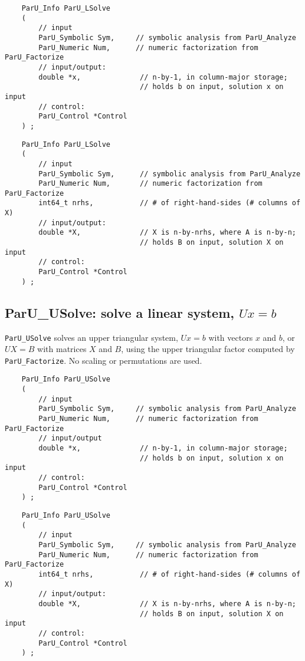 \documentclass[12pt]{article}
\begin{document}
    {\footnotesize
    \begin{verbatim}
    ParU_Info ParU_LSolve
    (
        // input
        ParU_Symbolic Sym,     // symbolic analysis from ParU_Analyze
        ParU_Numeric Num,      // numeric factorization from ParU_Factorize
        // input/output:
        double *x,              // n-by-1, in column-major storage;
                                // holds b on input, solution x on input
        // control:
        ParU_Control *Control
    ) ; \end{verbatim} }

    {\footnotesize
    \begin{verbatim}
    ParU_Info ParU_LSolve
    (
        // input
        ParU_Symbolic Sym,      // symbolic analysis from ParU_Analyze
        ParU_Numeric Num,       // numeric factorization from ParU_Factorize
        int64_t nrhs,           // # of right-hand-sides (# columns of X)
        // input/output:
        double *X,              // X is n-by-nrhs, where A is n-by-n;
                                // holds B on input, solution X on input
        // control:
        ParU_Control *Control
    ) ; \end{verbatim} }

\subsection{{\sf ParU\_USolve}: solve a linear system, $Ux=b$}

    \verb'ParU_USolve' solves an upper triangular system, $Ux=b$ with vectors
    $x$ and $b$, or $UX=B$ with matrices $X$ and $B$, using the upper
    triangular factor computed by \verb'ParU_Factorize'.  No scaling or
    permutations are used.

    {\footnotesize
    \begin{verbatim}
    ParU_Info ParU_USolve
    (
        // input
        ParU_Symbolic Sym,     // symbolic analysis from ParU_Analyze
        ParU_Numeric Num,      // numeric factorization from ParU_Factorize
        // input/output
        double *x,              // n-by-1, in column-major storage;
                                // holds b on input, solution x on input
        // control:
        ParU_Control *Control
    ) ; \end{verbatim} }

    {\footnotesize
    \begin{verbatim}
    ParU_Info ParU_USolve
    (
        // input
        ParU_Symbolic Sym,     // symbolic analysis from ParU_Analyze
        ParU_Numeric Num,      // numeric factorization from ParU_Factorize
        int64_t nrhs,           // # of right-hand-sides (# columns of X)
        // input/output:
        double *X,              // X is n-by-nrhs, where A is n-by-n;
                                // holds B on input, solution X on input
        // control:
        ParU_Control *Control
    ) ; \end{verbatim} }
\end{document}
